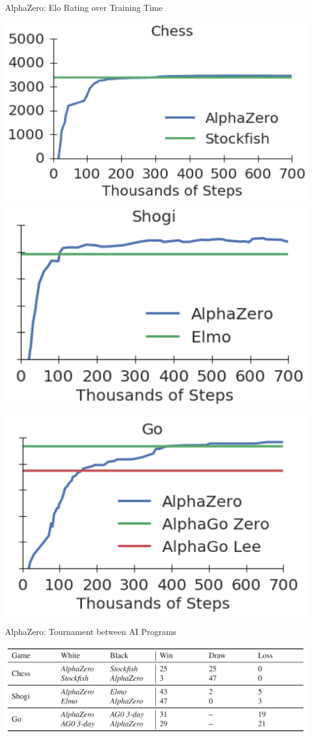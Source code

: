 \documentclass{beamer}
\begin{document}
{    \begin{frame}{AlphaZero: Elo Rating over Training Time}
      \begin{center}
        \pause
        \includegraphics[width=.5\textwidth]{../img/AlphaZero-paper/elo-vs-training-chess.png}
        \pause
        \includegraphics[width=.5\textwidth]{../img/AlphaZero-paper/elo-vs-training-shogi.png}

        \pause
        \includegraphics[height=.4\textheight]{../img/AlphaZero-paper/elo-vs-training-go.png}
      \end{center}
    \end{frame}

    \begin{frame}{AlphaZero: Tournament between AI Programs}
      \begin{center}
        \includegraphics[width=\textwidth]{../img/AlphaZero-paper/tournament-evaluation.png}
      \end{center}


\end{frame}}
\end{document}
